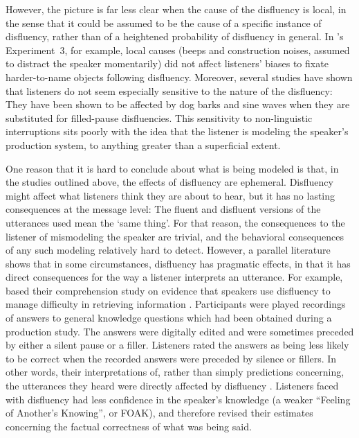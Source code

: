 \documentclass[a4paper,man,natbib]{apa6}
\begin{document}
However, the picture is far less clear when the cause of the disfluency is local, in the sense that it could be assumed to be the cause of a specific instance of disfluency, rather than of a heightened probability of disfluency in general.
In \citeauthor{Arnold2007}'s Experiment~3, for example, local causes (beeps and construction noises, assumed to distract the speaker momentarily) did not affect listeners' biases to fixate harder-to-name objects following disfluency.
Moreover, several studies have shown that listeners do not seem especially sensitive to the nature of the disfluency:  They have been shown to be affected by dog barks \citep{bailey2003disfluencies} and sine waves \citep{corley2011helps} when they are substituted for filled-pause disfluencies.
This sensitivity to non-linguistic interruptions sits poorly with the idea that the listener is modeling the speaker's production system, to anything greater than a superficial extent.

One reason that it is hard to conclude about what is being modeled is that, in the studies outlined above, the effects of disfluency are ephemeral.
Disfluency might affect what listeners think they are about to hear, but it has no lasting consequences at the message level:
The fluent and disfluent versions of the utterances used mean the `same thing'.
For that reason, the consequences to the listener of mismodeling the speaker are trivial, and the behavioral consequences of any such modeling relatively hard to detect.
However, a parallel literature shows that in some circumstances, disfluency has pragmatic effects, in that it has direct consequences for the way a listener interprets an utterance.
%
For example, \citet{Brennan1995} based their comprehension study on evidence that speakers use disfluency to manage difficulty in retrieving information \citep{Smith1993}.
Participants were played recordings of answers to general knowledge questions which had been obtained during a production study.
The answers were digitally edited and were sometimes preceded by either a silent pause or a filler.
Listeners rated the answers as being less likely to be correct when the recorded answers were preceded by silence or fillers.
In other words, their interpretations of, rather than simply predictions concerning, the utterances they heard were directly affected by disfluency \citep[see also][]{Swerts2005}.
Listeners faced with disfluency had less confidence in the speaker's knowledge (a weaker ``Feeling of Another's Knowing'', or FOAK), and therefore revised their estimates concerning the factual correctness of what was being said.
\end{document}
